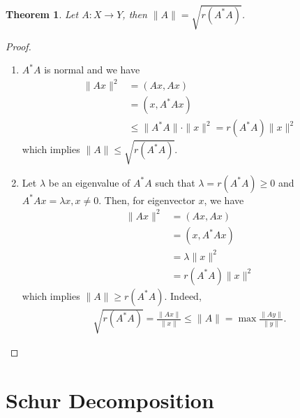 \documentclass[11pt]{book}
\newtheorem{theorem}{Theorem}[section]
\theoremstyle{definition}
\numberwithin{equation}{chapter}
\begin{document}
\begin{theorem}
Let $A:X\to Y$, then $\|A\| = \sqrt{r(A^*A)}$.
\end{theorem}
\begin{proof}
~\begin{enumerate}[label=(\alph*)]
    \item $A^*A$ is normal and we have
    \begin{align*}
        \|Ax\|^2 & = (Ax, Ax) \\
        & = (x, A^*Ax) \\
        & \leq \|A^*A\|\cdot \|x\|^2 = r(A^*A) \|x\|^2
    \end{align*}
    which implies $\|A\| \leq \sqrt{r(A^*A)}$.
    \item Let $\lambda$ be an eigenvalue of $A^*A$ such that $\lambda = r(A^*A) \geq 0$ and $A^*Ax = \lambda x, x\neq 0$. Then, for eigenvector $x$, we have
    \begin{align*}
        \|Ax\|^2 & = (Ax,Ax) \\
        & = (x,A^*Ax) \\
        & = \lambda \|x\|^2 \\
        & = r(A^*A) \|x\|^2 
    \end{align*}
    which implies $\|A\| \geq r(A^*A)$. Indeed, 
    \begin{align*}
        \sqrt{r(A^*A)} = \frac{\|Ax\|}{\|x\|} \leq \|A\| = \max \frac{\|Ay\|}{\|y\|}.
    \end{align*}
\end{enumerate}
\end{proof}

\medskip

\section{Schur Decomposition}
\end{document}

